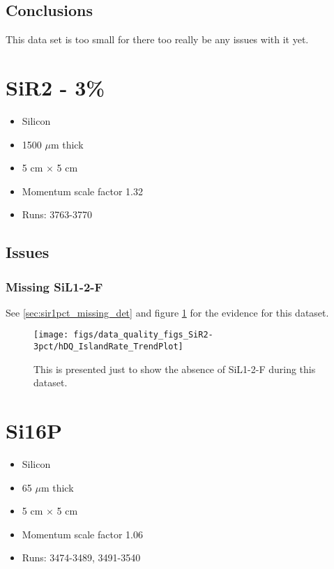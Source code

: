\documentclass[a4paper]{article}
\begin{document}
\subsection{Conclusions}
This data set is too small for there too really be any issues with it yet.


\section{SiR2 - 3\%}
\begin{itemize}
  \item Silicon
  \item 1500 $\mu$m thick
  \item 5 cm $\times$ 5 cm
  \item Momentum scale factor 1.32
  \item Runs:
    3763-3770
\end{itemize}


\subsection{Issues}
\subsubsection{Missing SiL1-2-F}
See \ref{sec:sir1pct_missing_det} and figure \ref{fig:sir3pct_rates} for the evidence for this dataset.

\begin{figure}
  \centering
  \texttt{[image: figs/data\_quality\_figs\_SiR2-3pct/hDQ\_IslandRate\_TrendPlot]}
  \caption{This is presented just to show the absence of SiL1-2-F during this dataset.}
  \label{fig:sir3pct_rates}
\end{figure}


\section{Si16P}
\begin{itemize}
  \item Silicon
  \item 65 $\mu$m thick
  \item 5 cm $\times$ 5 cm
  \item Momentum scale factor 1.06
  \item Runs:
    3474-3489, 3491-3540
\end{itemize}
\end{document}
